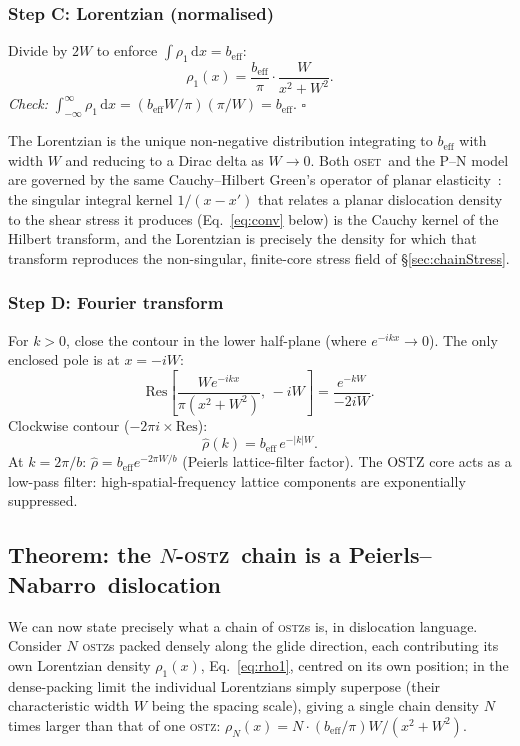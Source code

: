 \documentclass[5p,sort&compress]{elsarticle}
\newcommand{\OSTZ}{\textsc{ostz}}
\newcommand{\OSET}{\textsc{oset}}
\newcommand{\beff}{b_\mathrm{eff}}
\newcommand{\PN}{Peierls--Nabarro}
\begin{document}
\subsubsection{Step C: Lorentzian (normalised)}
\label{sec:stepC-lorentz}

Divide by $2W$ to enforce $\int\rho_1\,\mathrm dx=\beff$:
\begin{equation}
  \boxed{\rho_1(x)=\frac{\beff}{\pi}\cdot\frac{W}{x^2+W^2}.}
  \label{eq:rho1}
\end{equation}
\textit{Check:}
$\int_{-\infty}^\infty\rho_1\,\mathrm dx=(\beff W/\pi)(\pi/W)=\beff$.
$\square$

The Lorentzian is the unique non-negative distribution integrating to
$\beff$ with width $W$ and reducing to a Dirac delta as $W\to0$.
Both \OSET\ and the P--N model are governed by the same
Cauchy--Hilbert Green's operator of planar
elasticity~\cite{muskhelishvili1953,bilby1963}: the singular
integral kernel $1/(x-x')$ that relates a planar dislocation
density to the shear stress it produces (Eq.~\eqref{eq:conv} below)
is the Cauchy kernel of the Hilbert transform, and the Lorentzian is
precisely the density for which that transform reproduces the
non-singular, finite-core stress field of \S\ref{sec:chainStress}.

\subsubsection{Step D: Fourier transform}
\label{sec:stepD-fourier}

For $k>0$, close the contour in the lower half-plane (where
$e^{-ikx}\to0$). The only enclosed pole is at $x=-iW$:
\[
  \mathrm{Res}\!\left[\frac{We^{-ikx}}{\pi(x^2+W^2)},\,-iW\right]
  =\frac{e^{-kW}}{-2iW}.
\]
Clockwise contour ($-2\pi i\times\text{Res}$):
\begin{equation}
  \hat\rho(k)=\beff\,e^{-|k|W}.
  \label{eq:rhohat}
\end{equation}
At $k=2\pi/b$: $\hat\rho=\beff e^{-2\pi W/b}$ (Peierls lattice-filter
factor). The OSTZ core acts as a low-pass filter: high-spatial-frequency
lattice components are exponentially suppressed.

\subsection{Theorem: the $N$-\OSTZ\ chain is a \PN\ dislocation}
\label{sec:PN}

We can now state precisely what a chain of \OSTZ s is, in dislocation
language. Consider $N$ \OSTZ s packed densely along the glide
direction, each contributing its own Lorentzian density
$\rho_1(x)$, Eq.~\eqref{eq:rho1}, centred on its own position; in the
dense-packing limit the individual Lorentzians simply superpose
(their characteristic width $W$ being the spacing scale), giving a
single chain density $N$ times larger than that of one \OSTZ:
$\rho_N(x)=N\cdot(\beff/\pi)W/(x^2+W^2)$.
\end{document}

